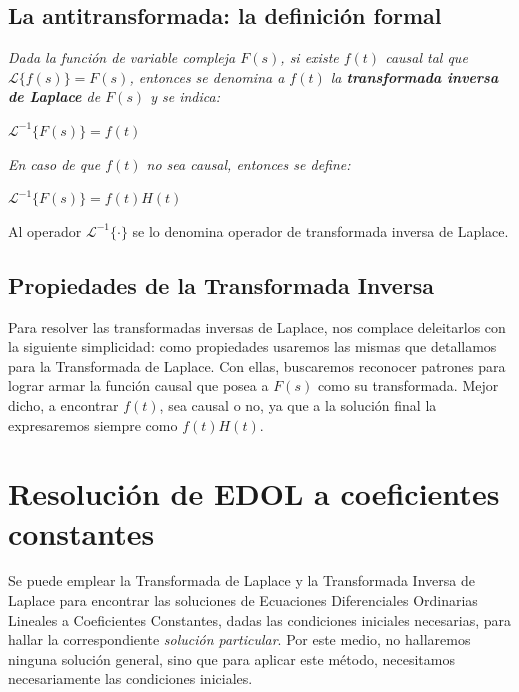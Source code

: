 \documentclass[12pt]{article}
\theoremstyle{definition}
\theoremstyle{theorem}
\theoremstyle{corolary}
\theoremstyle{method}
\begin{document}
\subsection*{La antitransformada: la definici\'on formal}
\textit{Dada la funci\'on de variable compleja $F(s)$, si existe $f(t)$ causal tal que $\mathscr{L}\{f(s)\} = F(s)$, entonces se denomina a $f(t)$ la \textbf{transformada inversa de Laplace} de $F(s)$ y se indica:}

\begin{center}
{\large$\mathscr{L}^{-1}\{F(s)\} = f(t)$}
\end{center}

\textit{En caso de que $f(t)$ no sea causal, entonces se define:}

\begin{center}
{\large$\mathscr{L}^{-1}\{F(s)\} = f(t)H(t)$}
\end{center}

Al operador $\mathscr{L}^{-1}\{\cdot\}$ se lo denomina operador de transformada inversa de Laplace.

\subsection*{Propiedades de la Transformada Inversa}
Para resolver las transformadas inversas de Laplace, nos complace deleitarlos con la siguiente simplicidad: como propiedades usaremos las mismas que detallamos para la Transformada de Laplace. Con ellas, buscaremos reconocer patrones para lograr armar la funci\'on causal que posea a $F(s)$ como su transformada. Mejor dicho, a encontrar $f(t)$, sea causal o no, ya que a la soluci\'on final la expresaremos siempre como $f(t)H(t)$.


\pagebreak
\section*{Resoluci\'on de EDOL a coeficientes constantes}

Se puede emplear la Transformada de Laplace y la Transformada Inversa de Laplace para encontrar las soluciones de Ecuaciones Diferenciales Ordinarias Lineales a Coeficientes Constantes, dadas las condiciones iniciales necesarias, para hallar la correspondiente \textit{soluci\'on particular}. Por este medio, no hallaremos ninguna soluci\'on general, sino que para aplicar este m\'etodo, necesitamos necesariamente las condiciones iniciales.
\end{document}
